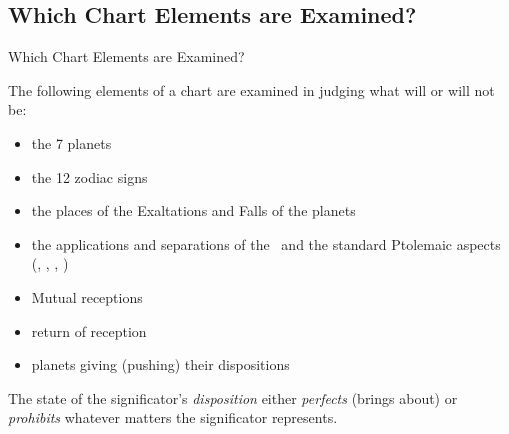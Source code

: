\subsection{Which Chart Elements are Examined?}
\begin{frame}[t]{Which Chart Elements are Examined?}

The following elements of a chart are examined in judging what will or will not be:
\begin{itemize}
\item the 7 planets
\item the 12 zodiac signs
\item the places of  the Exaltations and Falls of the planets
\item the applications and separations of the \Conjunction\ and the standard Ptolemaic aspects (\Sextile, \Square, \Trine, \Opposition)
\item Mutual receptions
\item return of reception
\item planets giving (pushing) their dispositions
\end{itemize}
\vspace{0.5cm}

The state of the significator's \textsl{disposition} either \textsl{perfects} (brings about) or \textsl{prohibits} whatever matters the significator represents.
\end{frame}
